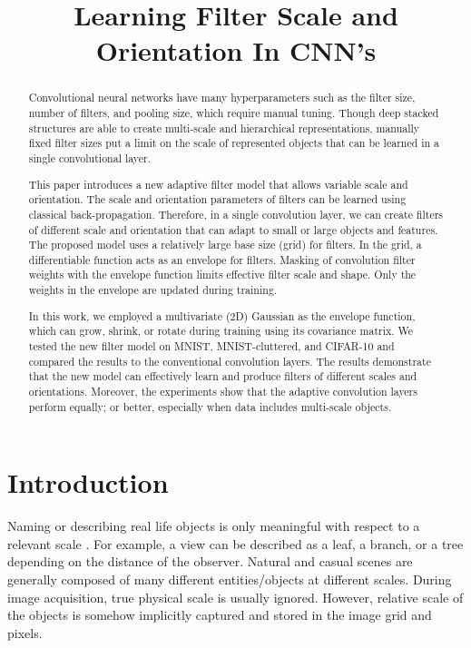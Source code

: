 \documentclass{bmvc2k}
\title{Learning Filter Scale and Orientation In CNN's}
\begin{document}
\maketitle

\begin{abstract}
	
Convolutional neural networks have many hyperparameters such as the filter size, number of filters, and pooling size, which require manual tuning. Though deep stacked structures are able to create multi-scale and hierarchical representations, manually fixed filter sizes put a limit on the scale of represented objects that can be learned in a single convolutional layer. 

This paper introduces a new adaptive filter model that allows variable scale and orientation. The scale and orientation parameters of filters can be learned using classical back-propagation. Therefore, in a single convolution layer, we can create filters of different scale and orientation that can adapt to small or large objects and features. The proposed model uses a relatively large base size (grid) for filters. In the grid, a differentiable function acts as an envelope for filters. Masking of convolution filter weights with the envelope function limits effective filter scale and shape. Only the weights in the envelope are updated during training. 

In this work, we employed a multivariate (2D) Gaussian as the envelope function, which can grow, shrink, or rotate during training using its covariance matrix. We tested the new filter model on MNIST, MNIST-cluttered, and CIFAR-10 and compared the results to the conventional convolution layers. The results demonstrate that the new model can effectively learn and produce filters of different scales and orientations. Moreover, the experiments show that the adaptive convolution layers perform equally; or better, especially when data includes multi-scale objects.

\end{abstract}

\section{Introduction}

Naming or describing real life objects is only meaningful with respect to a relevant scale \cite{Lindeberg:1994:STC:528688}. For example, a view can be described as a leaf, a branch, or a tree depending on the distance of the observer. Natural and casual scenes are generally composed of many different entities/objects at different scales. During image acquisition, true physical scale is usually ignored. However, relative scale of the objects is somehow implicitly captured and stored in the image grid and pixels. 
\end{document}
